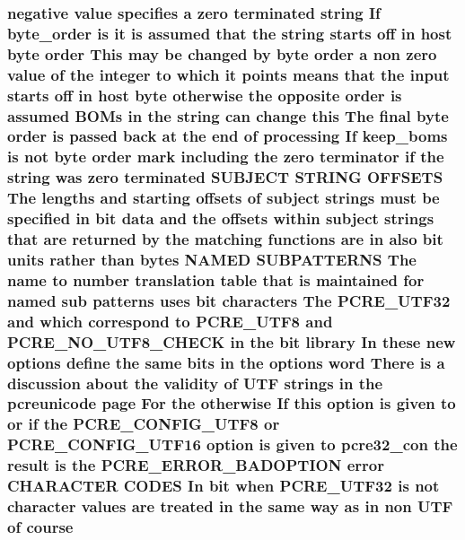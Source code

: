 \subsubsection[{\texorpdfstring{course}{course}}]{ negative {\bf value} specifies {\bf a} {\bf zero} terminated {\bf string} If byte\+\_\+order {\bf is} {\bf it} {\bf is} assumed that the {\bf string} starts off {\bf in} {\bf host} byte {\bf order} This may {\bf be} changed by byte {\bf order} {\bf a} non {\bf zero} {\bf value} {\bf of} the integer {\bf to} {\bf which} {\bf it} points means that the {\bf input} starts off {\bf in} {\bf host} byte otherwise the opposite {\bf order} {\bf is} assumed B\+O\+Ms {\bf in} the {\bf string} {\bf can} change {\bf this} The final byte {\bf order} {\bf is} passed back at the {\bf end} {\bf of} processing If keep\+\_\+boms {\bf is} {\bf not} byte {\bf order} {\bf mark} including the {\bf zero} terminator {\bf if} the {\bf string} was {\bf zero} terminated S\+U\+B\+J\+E\+CT {\bf S\+T\+R\+I\+NG} O\+F\+F\+S\+E\+TS The lengths and starting {\bf offsets} {\bf of} subject {\bf strings} must {\bf be} {\bf specified} {\bf in} {\bf bit} {\bf data} and the {\bf offsets} within subject {\bf strings} that {\bf are} returned by the {\bf matching} {\bf functions} {\bf are} {\bf in} also {\bf bit} {\bf units} rather {\bf than} {\bf bytes} N\+A\+M\+ED S\+U\+B\+P\+A\+T\+T\+E\+R\+NS The {\bf name} {\bf to} {\bf number} translation {\bf table} that {\bf is} maintained for named sub {\bf patterns} uses {\bf bit} {\bf characters} The {\bf P\+C\+R\+E\+\_\+\+U\+T\+F32} and {\bf which} correspond {\bf to} {\bf P\+C\+R\+E\+\_\+\+U\+T\+F8} and {\bf P\+C\+R\+E\+\_\+\+N\+O\+\_\+\+U\+T\+F8\+\_\+\+C\+H\+E\+CK} {\bf in} the {\bf bit} {\bf library} In these new {\bf options} define the same bits {\bf in} the {\bf options} {\bf word} There {\bf is} {\bf a} discussion about the validity {\bf of} U\+TF {\bf strings} {\bf in} the pcreunicode page For the otherwise If {\bf this} {\bf option} {\bf is} {\bf given} {\bf to} {\bf or} {\bf if} the {\bf P\+C\+R\+E\+\_\+\+C\+O\+N\+F\+I\+G\+\_\+\+U\+T\+F8} {\bf or} {\bf P\+C\+R\+E\+\_\+\+C\+O\+N\+F\+I\+G\+\_\+\+U\+T\+F16} {\bf option} {\bf is} {\bf given} {\bf to} pcre32\+\_\+con the {\bf result} {\bf is} the {\bf P\+C\+R\+E\+\_\+\+E\+R\+R\+O\+R\+\_\+\+B\+A\+D\+O\+P\+T\+I\+ON} {\bf error} C\+H\+A\+R\+A\+C\+T\+ER C\+O\+D\+ES In {\bf bit} when {\bf P\+C\+R\+E\+\_\+\+U\+T\+F32} {\bf is} {\bf not} {\bf character} {\bf values} {\bf are} treated {\bf in} the same {\bf way} {\bf as} {\bf in} non U\+TF {\bf of} course}\hypertarget{README_8txt_a02e85ab8476f24744f093452479407f7}{}\label{README_8txt_a02e85ab8476f24744f093452479407f7}
